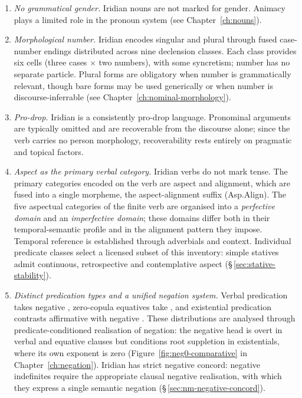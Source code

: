 \begin{enumerate}[wide]
	\item \textit{No grammatical gender.} Iridian nouns are not marked for
	gender. Animacy plays a limited role in the pronoun system (see
	Chapter~\ref{ch:nouns}).

	\item \textit{Morphological number.} Iridian encodes singular and plural
	through fused case-number endings distributed across nine declension classes.
	Each class provides six
	cells (three cases $\times$ two numbers), with some syncretism; number has no
	separate particle. Plural forms are obligatory when number is
	grammatically relevant, though bare forms may be used generically or
	when number is discourse-inferrable (see Chapter~\ref{ch:nominal-morphology}).

	\item \textit{Pro-drop.} Iridian is a consistently pro-drop language.
	Pronominal arguments are typically omitted and are recoverable from the
	discourse alone; since the verb carries no person morphology, recoverability
	rests entirely on pragmatic and topical factors.

	\item \textit{Aspect as the primary verbal category.} Iridian verbs do not
	mark tense. The primary categories encoded on the verb are aspect and
	alignment, which are fused into a single morpheme, the aspect-alignment
	suffix (Asp.Align). The five aspectual categories of the finite verb are
	organised into a \textit{perfective domain} and an \textit{imperfective
	domain}; these domains differ both in their temporal-semantic profile and
	in the alignment pattern they impose. Temporal reference is established
	through adverbials and context. Individual predicate classes select a
	licensed subset of this inventory: simple statives admit continuous,
	retrospective and contemplative aspect (§\,\ref{sec:stative-stability}).

		\item \textit{Distinct predication types and a unified negation system.}
		Verbal predication takes negative , zero-copula equatives take
		, and existential predication contrasts affirmative
		 with negative . These distributions are analysed
		through predicate-conditioned realisation of negation: the negative head
		is overt in verbal and equative clauses but conditions root suppletion
		in existentials, where its own exponent is zero
		(Figure~\ref{fig:neg0-comparative} in Chapter~\ref{ch:negation}).
        Iridian has strict negative concord: negative indefinites require the
        appropriate clausal negative realisation, with which they express a
        single semantic negation (§\,\ref{sec:nm-negative-concord}).
\end{enumerate}

